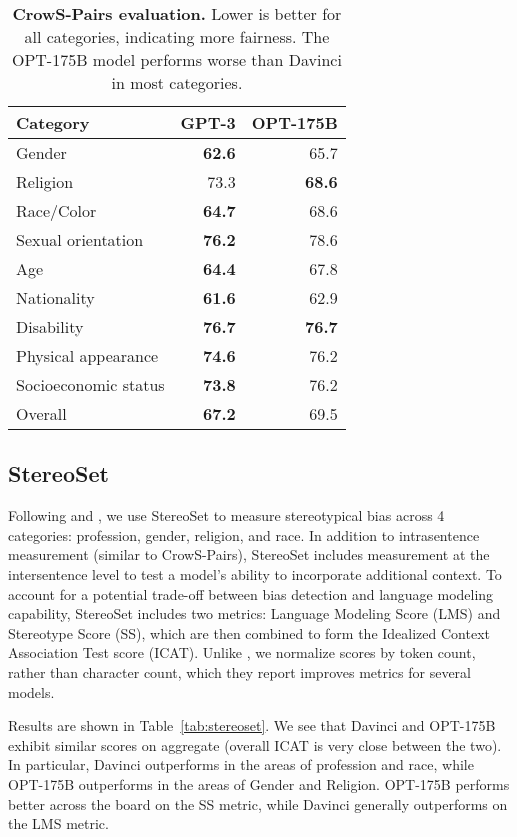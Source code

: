 \documentclass[11pt]{article}
\newcommand{\OPT}[0]{{OPT-175B}}
\newcommand{\davinci}[0]{{Davinci}}
\begin{document}
\begin{table}[t]
    \centering
    \begin{tabular}{lrr}
\toprule
Category &  {\bf GPT-3} & {\bf \OPT{}}\\
\midrule
Gender    & {\bf 62.6} & 65.7\\
Religion & 73.3	& {\bf 68.6}\\
Race/Color & {\bf 64.7} & 68.6\\
Sexual orientation & {\bf 76.2} & 78.6\\
Age & {\bf 64.4} & 67.8\\
Nationality & {\bf 61.6} & 62.9\\
Disability & {\bf 76.7} & {\bf 76.7}\\
Physical appearance & {\bf 74.6} & {76.2}\\
Socioeconomic status & {\bf 73.8} & 76.2\\
\cmidrule(lr){1-3}
Overall & {\bf 67.2} & 69.5\\
\bottomrule
    \end{tabular}
    \caption{{\bf CrowS-Pairs evaluation.} Lower is better for all categories, indicating more fairness. The \OPT{} model
    performs worse than \davinci{} in most categories.}
    \label{tab:crowspairs}
\end{table}

\subsection{StereoSet}

Following \citet{J1WhitePaper} and \citet{1TMoE2021}, we use StereoSet \cite{nadeem2020stereoset} to measure stereotypical bias across 4 categories: profession, gender, religion, and race.  In addition to intrasentence measurement (similar to CrowS-Pairs), StereoSet includes  measurement at the intersentence level to test a model's ability to incorporate additional context.  To account for a potential trade-off between bias detection and language modeling capability, StereoSet includes two metrics: Language Modeling Score (LMS) and Stereotype Score (SS), which are then combined to form the Idealized Context Association Test score (ICAT). Unlike \citet{J1WhitePaper}, we normalize scores by token count, rather than character count, which they report improves metrics for several models.

Results are shown in Table~\ref{tab:stereoset}. We see that \davinci{} and \OPT{} exhibit similar scores on aggregate (overall ICAT is very close between the two). In particular, \davinci{} outperforms in the areas of profession and race, while \OPT{} outperforms in the areas of Gender and Religion. \OPT{} performs better across the board on the SS metric, while \davinci{} generally outperforms on the LMS metric.
\end{document}
